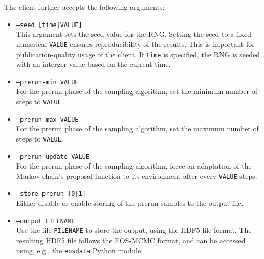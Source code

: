 The  client further accepts the following arguments:
\begin{itemize}
    \item[] \texttt{--seed [time|VALUE]}\\[\medskipamount]
        This argument sets the seed value for the \gls{RNG}. Setting the
        seed to a fixed numerical \texttt{VALUE} ensures reproducibility of the results. This
        is important for publication-quality usage of the client. If \texttt{time} is
        specified, the \gls{RNG} is seeded with an interger value based on the current time.

    \item[] \texttt{--prerun-min VALUE}\\[\medskipamount]
        For the prerun phase of the sampling algorithm, set the minimum number of
        steps to \texttt{VALUE}.

    \item[] \texttt{--prerun-max VALUE}\\[\medskipamount]
        For the prerun phase of the sampling algorithm, set the maximum number of
        steps to \texttt{VALUE}.

    \item[] \texttt{--prerun-update VALUE}\\[\medskipamount]
        For the prerun phase of the sampling algorithm, force an adaptation of the
        Markov chain's proposal function to its environment after every \texttt{VALUE}
        steps.

    \item[] \texttt{--store-prerun [0|1]}\\[\medskipamount]
        Either disable or enable storing of the prerun samples to the output file.\\

    \item[] \texttt{--output FILENAME}\\[\medskipamount]
        Use the file \texttt{FILENAME} to store the output, using the HDF5 file format.
        The resulting HDF5 file follows the EOS-MCMC format, and can be accessed using, e.g.,
        the \texttt{eosdata} Python module.
\end{itemize}

